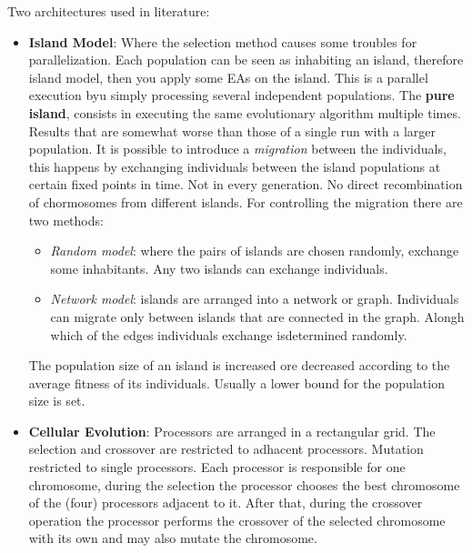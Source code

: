 \documentclass{article}
\begin{document}
Two architectures used in literature:
\begin{itemize}
    \item \textbf{Island Model}: Where the selection method causes some troubles for parallelization.
          Each population can be seen as inhabiting an island, therefore island model, then you
          apply some EAs on the island. This is a parallel execution byu simply processing several
          independent populations.
          \newline\newline
          The \textbf{pure island},
          consists in executing the same evolutionary algorithm multiple times. Results that are somewhat worse than
          those of a single run with a larger population.
          \newline\newline
          It is possible to introduce a \textit{migration} between the individuals, this happens by exchanging
          individuals between the island populations at certain fixed points in time. Not in every generation.
          No direct recombination of chormosomes from different islands.
          \newline\newline
          For controlling the migration there are two methods:
          \begin{itemize}
              \item \textit{Random model}: where the pairs of islands are chosen randomly, exchange
                    some inhabitants. Any two islands can exchange individuals.
              \item \textit{Network model}: islands are arranged into a network or graph. Individuals
                    can migrate only between islands that are connected in the graph. Alongh which of the
                    edges individuals exchange isdetermined randomly.
          \end{itemize}

          The population size of an island is increased ore decreased according to the average fitness
          of its individuals. Usually a lower bound for the population size is set.

    \item \textbf{Cellular Evolution}: Processors are arranged in a rectangular grid. The
          selection and crossover are restricted to adhacent processors. Mutation restricted to single processors.
          Each processor is responsible for one chromosome, during the selection the processor chooses
          the best chromosome of the (four) processors adjacent to it. After that, during the
          crossover operation the processor performs the crossover of the selected chromosome with its own and
          may also mutate the chromosome.

\end{itemize}
\end{document}
